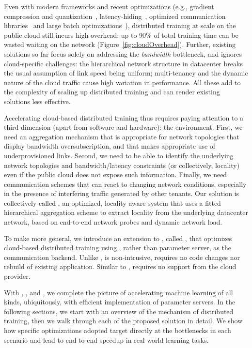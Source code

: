 Even with modern frameworks and recent optimizations 
(e.g., gradient compression and quantization~\cite{lin2017deep, cntk1bt, lim20183lc}, latency-hiding~\cite{poseidon, jayarajan2019priority,hashemi2018tictac}, optimized communication libraries~\cite{facebook35:online, Operatio73:online, dmlcpsli50:online} and large batch optimizations~\cite{ImageNetIn1Hour}), distributed training at scale on the public cloud still incurs high overhead: up to 90\% of total training time can be wasted waiting on the network (Figure~\ref{fig:cloudOverhead}). Further, existing solutions so far focus solely on addressing the \textit{bandwidth} bottleneck, and ignores cloud-specific challenges: the hierarchical network structure in datacenter breaks the usual assumption of link speed being uniform; multi-tenancy and the dynamic nature of the cloud traffic cause high variation in performance. All these add to the complexity of scaling up distributed training and can render existing solutions less effective. 

Accelerating cloud-based distributed training thus requires paying attention to a third dimension (apart from software and hardware): the environment. First, we need an aggregation mechanism that is appropriate for network topologies that display bandwidth oversubscription, and that makes appropriate use of underprovisioned links.  Second, we need to be able to identify the underlying network topologies and bandwidth/latency constraints (or collectively, locality) even if the public cloud does not expose such information.  Finally, we need communication schemes that can react to changing network conditions, especially in the presence of interfering traffic generated by other tenants. Our solution is collectively called \plink, an optimized, locality-aware system that uses a fitted hierarchical aggregation scheme to extract locality from the underlying datacenter network, based on end-to-end network probes and dynamic network load. 

To make \plink more general, we introduce an extension to \plink, called \cmpi, that optimizes cloud-based distributed training using \collectives, rather than parameter server, as the communication backend. Unlike \plink, \cmpi is non-intrusive, requires no code changes nor rebuild of existing application. Similar to \plink, \cmpi requires no support from the cloud provider.

With \pbox, \phub, \plink and \cmpi, we complete the picture of accelerating machine learning of all kinds, ubiquitously, with efficient implementation of parameter servers. In the following sections, we start with an overview of the mechanism of distributed training, then we walk through each of the proposed solution in detail. We show how specific optimizations adopted target directly at the bottlenecks in each scenario and lead to end-to-end speedup in real-world learning tasks.